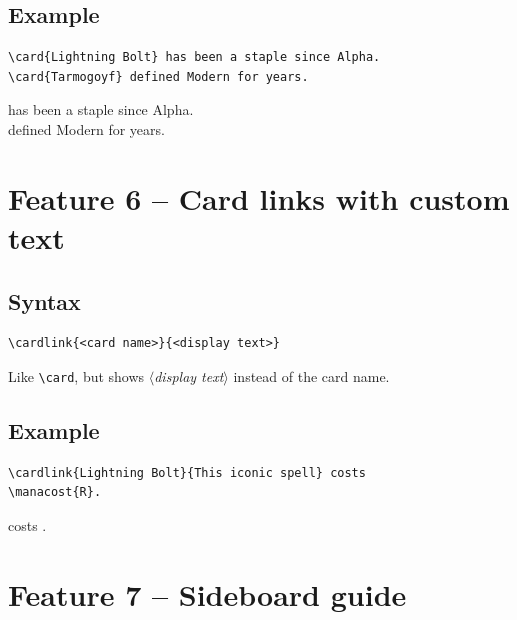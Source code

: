 \documentclass[a4paper,11pt]{article}
\newcommand{\cmd}[1]{\texttt{\textbackslash#1}}
\newcommand{\meta}[1]{\textnormal{\textit{$\langle$#1$\rangle$}}}
\begin{document}
\subsection{Example}

\begin{lstlisting}
\card{Lightning Bolt} has been a staple since Alpha.
\card{Tarmogoyf} defined Modern for years.
\end{lstlisting}
\begin{result}
 has been a staple since Alpha.\\
 defined Modern for years.
\end{result}

\section{Feature 6 -- Card links with custom text}

\subsection{Syntax}

\begin{lstlisting}
\cardlink{<card name>}{<display text>}
\end{lstlisting}

Like \cmd{card}, but shows \meta{display text} instead of
the card name.

\subsection{Example}

\begin{lstlisting}
\cardlink{Lightning Bolt}{This iconic spell} costs
\manacost{R}.
\end{lstlisting}
\begin{result}
 costs .
\end{result}

\section{Feature 7 -- Sideboard guide}
\end{document}

